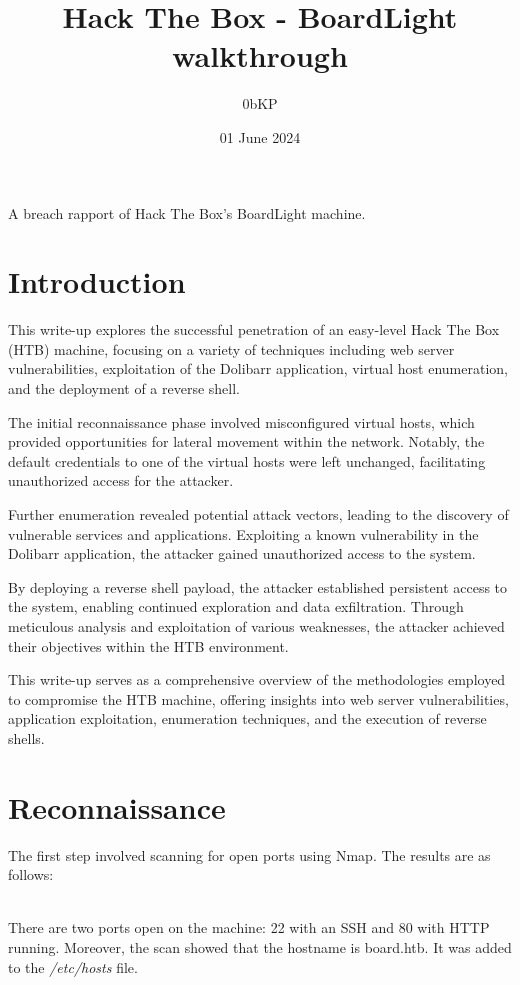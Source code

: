 \documentclass[12pt, letterpaper]{article}
\title{Hack The Box - BoardLight walkthrough}
\author{0bKP}
\date{01 June 2024}
\begin{document}
\maketitle
A breach rapport of Hack The Box's BoardLight machine.

\tableofcontents

\section{Introduction}
This write-up explores the successful penetration of an easy-level Hack The Box (HTB) 
machine, focusing on a variety of techniques including web server vulnerabilities,
exploitation of the Dolibarr application, virtual host enumeration, and the deployment 
of a reverse shell.

The initial reconnaissance phase involved misconfigured virtual hosts, which provided 
opportunities for lateral movement within the network. Notably, the default credentials 
to one of the virtual hosts were left unchanged, facilitating unauthorized access for the attacker.

Further enumeration revealed potential attack vectors, leading to the discovery of vulnerable 
services and applications. Exploiting a known vulnerability in the Dolibarr application, the 
attacker gained unauthorized access to the system.

By deploying a reverse shell payload, the attacker established persistent access to the 
system, enabling continued exploration and data exfiltration. Through meticulous analysis 
and exploitation of various weaknesses, the attacker achieved their objectives within the 
HTB environment.

This write-up serves as a comprehensive overview of the methodologies employed to compromise 
the HTB machine, offering insights into web server vulnerabilities, application exploitation, 
enumeration techniques, and the execution of reverse shells.

\section{Reconnaissance}

The first step involved scanning for open ports using Nmap. The results
are as follows: 
\\\\
\noindent   

There are two ports open on the machine: 22 with an SSH and 80 with HTTP running.
Moreover, the scan showed that the hostname is board.htb. It was added to the
\textit{/etc/hosts} file.
\end{document}

